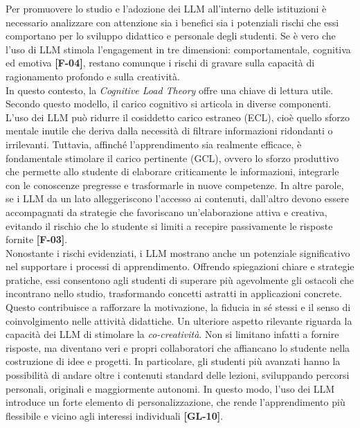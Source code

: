 \documentclass[a4paper,9pt]{article}
\begin{document}
Per promuovere lo studio e l’adozione dei LLM all’interno delle istituzioni è necessario analizzare con attenzione sia i benefici sia i potenziali rischi che essi comportano per lo sviluppo didattico e personale degli studenti. Se è vero che l'uso di LLM stimola l’engagement in tre dimensioni: comportamentale, cognitiva ed emotiva \textbf{[F-04]}, restano comunque i rischi di gravare sulla capacità di ragionamento profondo e sulla creatività.\\
In questo contesto, la \emph{Cognitive Load Theory} offre una chiave di lettura utile. Secondo questo modello, il carico cognitivo si articola in diverse componenti. L’uso dei LLM può ridurre il cosiddetto carico estraneo (ECL), cioè quello sforzo mentale inutile che deriva dalla necessità di filtrare informazioni ridondanti o irrilevanti. Tuttavia, affinché l’apprendimento sia realmente efficace, è fondamentale stimolare il carico pertinente (GCL), ovvero lo sforzo produttivo che permette allo studente di elaborare criticamente le informazioni, integrarle con le conoscenze pregresse e trasformarle in nuove competenze. In altre parole, se i LLM da un lato alleggeriscono l’accesso ai contenuti, dall’altro devono essere accompagnati da strategie che favoriscano un’elaborazione attiva e creativa, evitando il rischio che lo studente si limiti a recepire passivamente le risposte fornite \textbf{[F-03]}.\\
Nonostante i rischi evidenziati, i LLM mostrano anche un potenziale significativo nel supportare i processi di apprendimento. Offrendo spiegazioni chiare e strategie pratiche, essi consentono agli studenti di superare più agevolmente gli ostacoli che incontrano nello studio, trasformando concetti astratti in applicazioni concrete. Questo contribuisce a rafforzare la motivazione, la fiducia in sé stessi e il senso di coinvolgimento nelle attività didattiche. Un ulteriore aspetto rilevante riguarda la capacità dei LLM di stimolare la \textit{co-creatività}. Non si limitano infatti a fornire risposte, ma diventano veri e propri collaboratori che affiancano lo studente nella costruzione di idee e progetti. In particolare, gli studenti più avanzati hanno la possibilità di andare oltre i contenuti standard delle lezioni, sviluppando percorsi personali, originali e maggiormente autonomi. In questo modo, l’uso dei LLM introduce un forte elemento di personalizzazione, che rende l’apprendimento più flessibile e vicino agli interessi individuali \textbf{[GL-10]}.\\
\end{document}

